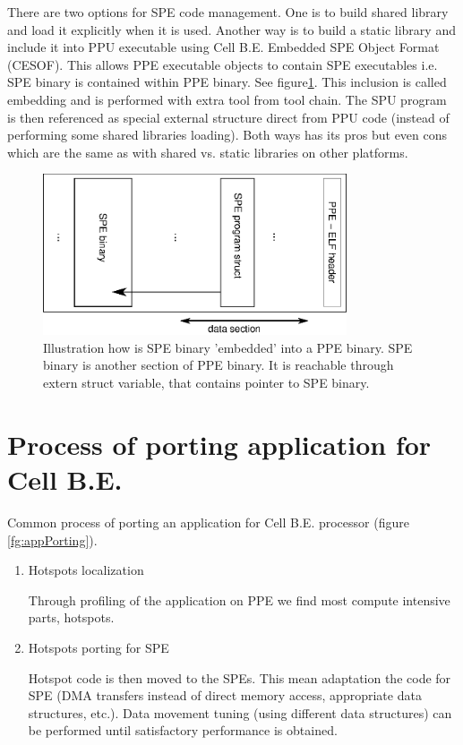\par
There are two options for SPE code management.
 One is to build shared library and load it explicitly when it is used.
Another way is to build a static library and include it into PPU executable using Cell B.E. Embedded SPE Object Format (CESOF).
This allows PPE executable objects to contain SPE executables i.e. SPE binary is contained within PPE binary. See figure\ref{fg:SPEEmbedding}.
This inclusion is called embedding and is performed with extra tool from tool chain.
The SPU program is then referenced as special external structure direct from PPU code (instead of performing some shared libraries loading).
Both ways has its pros but even cons which are the same as with shared vs. static libraries on other platforms.


\begin{figure}
    \centering
    \includegraphics[width=0.8\textwidth]{data/SPEEmbedding}
    \caption[SPE binary embedding]{Illustration how is SPE binary 'embedded' into a PPE binary.
SPE binary is another section of PPE binary.
It is reachable through extern struct variable, that contains pointer to SPE binary.}
    \label{fg:SPEEmbedding}
\end{figure}



\section {Process of porting application for Cell B.E.}
\label{sect:portingProcess}

Common process of porting an application for Cell B.E. processor (figure \ref{fg:appPorting}).
\begin{enumerate}
\item Hotspots localization
\par
Through profiling of the application on PPE we find most compute intensive parts, hotspots.

\item Hotspots porting for SPE
\par
Hotspot code is then moved to the SPEs.
This mean adaptation the code for SPE (DMA transfers instead of direct memory access, appropriate data structures, etc.).
Data movement tuning (using different data structures) can be performed until satisfactory performance is obtained.
\end{enumerate}

